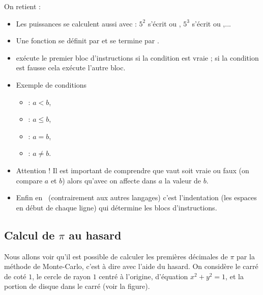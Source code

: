 \documentclass[class=report,crop=false]{standalone}
\begin{document}
On retient :
\begin{itemize}
  \item Les puissances se calculent aussi avec \codeinline{**} : $5^2$ s'écrit  ou ,
  $5^3$ s'écrit  ou ,...

  \item Une fonction se définit par  et se termine par
  .

  \item    {} exécute le premier
  bloc d'instructions si la condition est vraie ;
   si la condition est fausse cela exécute l'autre bloc.

  \item Exemple de conditions
  \begin{itemize}
     \item {} : $a<b$,
     \item {} : $a \le b$,
     \item {} : $a=b$,
     \item {} : $a \neq b$.
  \end{itemize}

  \item Attention ! Il est important de comprendre que  vaut soit vraie ou faux (on compare $a$ et $b$)
  alors qu'avec  on affecte dans $a$ la valeur de $b$.

  \item Enfin en \Python\  (contrairement aux autres langages) c'est l'indentation (les espaces en début de chaque ligne)
  qui détermine les blocs d'instructions.
\end{itemize}

\subsection{Calcul de $\pi$ au hasard}

Nous allons voir qu'il est possible de calculer les premières décimales de $\pi$ par la méthode de Monte-Carlo,
c'est à dire avec l'aide du hasard.
On considère le carré de coté $1$, le cercle de rayon $1$ centré à l'origine, d'équation $x^2+y^2=1$,
et la portion de disque dans le carré (voir la figure).

\end{document}
